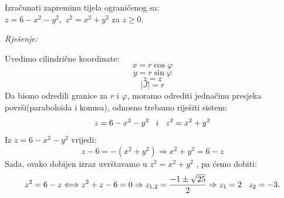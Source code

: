 \documentclass[a4paper,11pt]{article}
\begin{document}
\begin{tcolorbox}[colback=brown!35!white,colframe=white!75!white,title= $$\bullet \bullet \bullet$$]
         \begin{zadatak}
Izračunati zapreminu tijela ograničenog sa:\\
$  z= 6 - x^2 - y^2  ,$ $z^{2} =  x^2 + y^2   $ za $z\geq 0.$
\end{zadatak}
\end{tcolorbox}
\emph{Rješenje: }
\begin{center}
\end{center}
Uvedimo cilindrične koordinate:
$$x= r\cos{\varphi}$$
$$y= r\sin{\varphi}$$
$$z=z$$
$$|J|= r$$
Da bismo odredili granice za $r$ i $\varphi$, moramo odrediti jednačinu presjeka površi(paraboloida i konusa), odnosno trebamo riješiti sistem:
$$z= 6 - x^2 - y^2 \hspace{0.3 cm} i \hspace{0.3 cm} z^2  =  x^2 + y^2   $$
Iz $z= 6 - x^2 - y^2$ vrijedi:
$$z-6 = -(x^2 + y^2) \Rightarrow x^2 + y^2 = 6-z $$
Sada, ovako dobijen izraz uvrštavamo u $ z^2  =  x^2 + y^2  $ , pa ćemo dobiti:
$$z^2  = 6-z \Longleftrightarrow z^2 +z - 6 =0 \Rightarrow z_{1,2}  = \frac{-1\pm \sqrt{25}}{2} \Rightarrow z_1 = 2 \hspace{0.3 cm} z_2 = -3. $$
\end{document}
